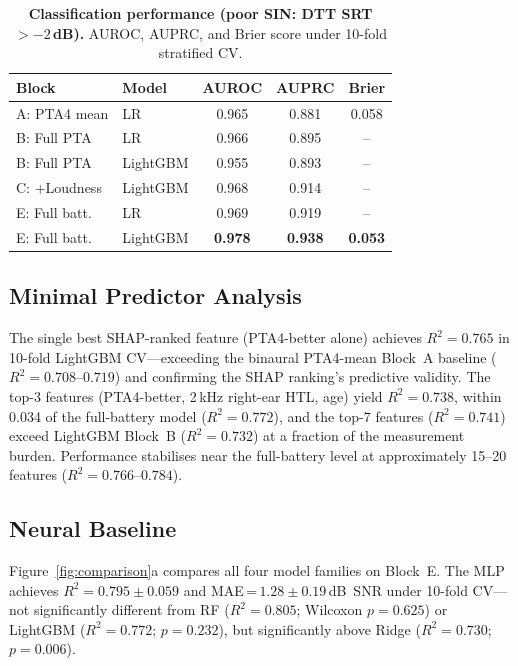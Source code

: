 \documentclass[12pt,a4paper]{article}
\begin{document}
\begin{table}[htbp]
\caption{\textbf{Classification performance (poor SIN: DTT SRT $>{-2}$\,dB).}
AUROC, AUPRC, and Brier score under 10-fold stratified CV.}
\label{tab:classification}
\centering\small
\begin{tabular}{llccc}
\toprule
Block & Model & AUROC & AUPRC & Brier \\
\midrule
A: PTA4 mean  & LR        & 0.965 & 0.881 & 0.058 \\
B: Full PTA   & LR        & 0.966 & 0.895 & --   \\
B: Full PTA   & LightGBM  & 0.955 & 0.893 & --   \\
C: +Loudness  & LightGBM  & 0.968 & 0.914 & --   \\
E: Full batt. & LR        & 0.969 & 0.919 & --   \\
E: Full batt. & LightGBM  & \textbf{0.978} & \textbf{0.938} & \textbf{0.053} \\
\bottomrule
\end{tabular}
\end{table}

\subsection{Minimal Predictor Analysis}

The single best SHAP-ranked feature (PTA4-better alone) achieves $R^2{=}0.765$
in 10-fold LightGBM CV---exceeding the binaural PTA4-mean Block~A baseline
($R^2{=}0.708$--$0.719$) and confirming the SHAP ranking's predictive
validity.  The top-3 features (PTA4-better, 2\,kHz right-ear HTL, age) yield
$R^2{=}0.738$, within 0.034 of the full-battery model ($R^2{=}0.772$), and
the top-7 features ($R^2{=}0.741$) exceed LightGBM Block~B ($R^2{=}0.732$)
at a fraction of the measurement burden.  Performance stabilises near the
full-battery level at approximately 15--20 features ($R^2{=}0.766$--$0.784$).

\subsection{Neural Baseline}

Figure~\ref{fig:comparison}a compares all four model families on Block~E.
The MLP achieves $R^2{=}0.795\pm0.059$ and MAE\,=\,$1.28\pm0.19$\,dB~SNR
under 10-fold CV---not significantly different from RF ($R^2{=}0.805$;
Wilcoxon $p{=}0.625$) or LightGBM ($R^2{=}0.772$; $p{=}0.232$), but
significantly above Ridge ($R^2{=}0.730$; $p{=}0.006$).
\end{document}
